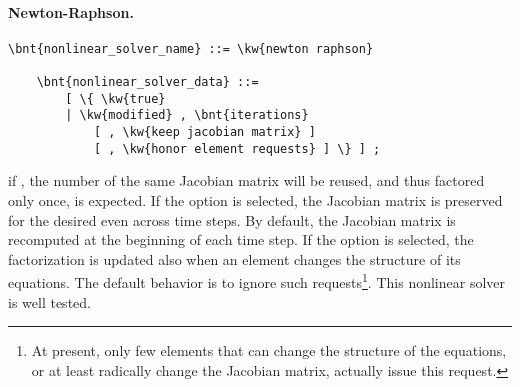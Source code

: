 \paragraph{Newton-Raphson.}
\begin{Verbatim}[commandchars=\\\{\}]
    \bnt{nonlinear_solver_name} ::= \kw{newton raphson}

    \bnt{nonlinear_solver_data} ::=
        [ \{ \kw{true}
        | \kw{modified} , \bnt{iterations}
            [ , \kw{keep jacobian matrix} ]
            [ , \kw{honor element requests} ] \} ] ;
\end{Verbatim}
if , the number of  the same Jacobian matrix 
will be reused, and thus factored only once, is expected.
If the option  is selected,
the Jacobian matrix is preserved
for the desired  even across time steps.
By default, the Jacobian matrix is recomputed at the beginning 
of each time step.
If the option  is selected, the factorization
is updated also when an element changes the structure of its equations.
The default behavior is to ignore such requests\footnote{
	At present, only few elements that can change the structure
	of the equations, or at least radically change the Jacobian matrix,
	actually issue this request.
}.
This nonlinear solver is well tested.

